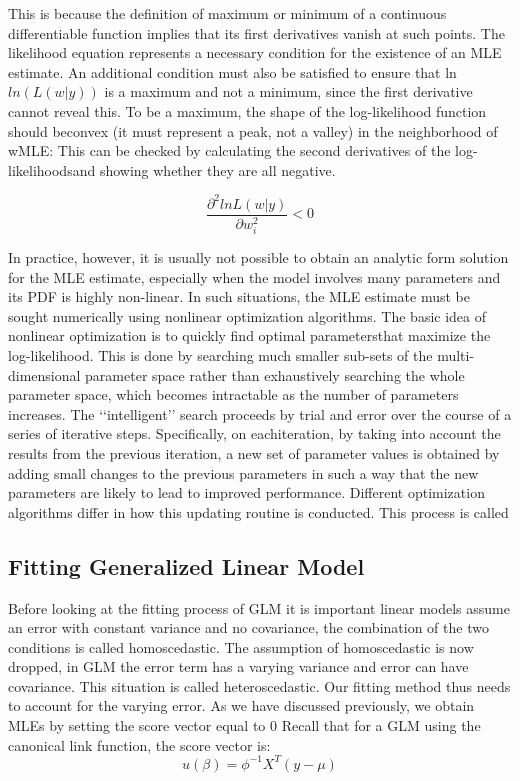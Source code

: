 \documentclass{article}
\begin{document}
    This is because the definition of maximum or minimum of a continuous differentiable function implies that its first derivatives vanish at such points. The likelihood equation represents a necessary condition for the existence of an MLE estimate. An additional condition must also be satisfied to ensure that ln $ln(L(w|y))$ is a maximum and not a minimum, since the first derivative cannot reveal this. To be a maximum, the shape of the log-likelihood function should beconvex (it must represent a peak, not a valley) in the neighborhood of wMLE: This can be checked by calculating the second derivatives of the log-likelihoodsand showing whether they are all negative.

    \begin{equation} \frac{\partial^2 ln L(w|y)}{\partial w^2_i} < 0 \end{equation}

    In practice, however, it is usually not possible to obtain an analytic form solution for the MLE estimate, especially when the model involves many parameters and its PDF is highly non-linear. In such situations, the MLE estimate must be sought numerically using nonlinear optimization algorithms. The basic idea of nonlinear optimization is to quickly find optimal parametersthat maximize the log-likelihood. This is done by searching much smaller sub-sets of the multi-dimensional parameter space rather than exhaustively searching the whole parameter space, which becomes intractable as the number of parameters increases. The ‘‘intelligent’’ search proceeds by trial and error over the
    course of a series of iterative steps. Specifically, on eachiteration, by taking into account the results from the previous iteration, a new set of parameter values is obtained by adding small changes to the previous parameters in such a way that the new parameters are likely to lead to improved performance. Different optimization algorithms differ in how this updating routine is conducted. This process is called

    \subsection{Fitting Generalized Linear Model}
    Before looking at the fitting process of GLM it is important  linear models assume an error with constant variance and no covariance, the combination of the two conditions is called homoscedastic. The assumption of homoscedastic is now dropped, in GLM the error term has a varying variance and error can have covariance. This situation is called heteroscedastic. Our fitting method thus needs to account for the varying error. As we have discussed previously, we obtain MLEs by setting the score vector equal to 0 Recall that for a GLM using the canonical link function, the score vector is:
    \begin{equation} u(\beta) = \phi ^{-1} X^T(y-\mu) \end{equation}
\end{document}
